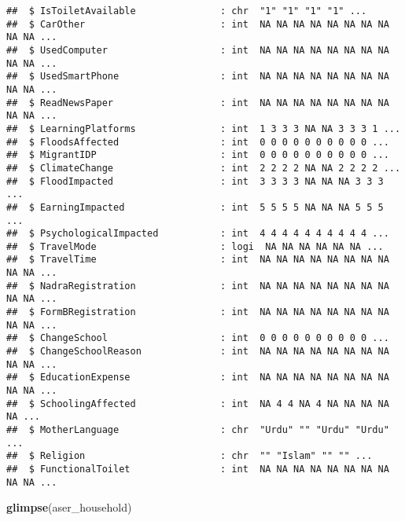 \documentclass[
]{article}
\newenvironment{Shaded}{\begin{snugshade}}{\end{snugshade}}
\newcommand{\FunctionTok}[1]{\textcolor[rgb]{0.13,0.29,0.53}{\textbf{#1}}}
\newcommand{\NormalTok}[1]{#1}
\begin{document}
\begin{verbatim}
##  $ IsToiletAvailable               : chr  "1" "1" "1" "1" ...
##  $ CarOther                        : int  NA NA NA NA NA NA NA NA NA NA ...
##  $ UsedComputer                    : int  NA NA NA NA NA NA NA NA NA NA ...
##  $ UsedSmartPhone                  : int  NA NA NA NA NA NA NA NA NA NA ...
##  $ ReadNewsPaper                   : int  NA NA NA NA NA NA NA NA NA NA ...
##  $ LearningPlatforms               : int  1 3 3 3 NA NA 3 3 3 1 ...
##  $ FloodsAffected                  : int  0 0 0 0 0 0 0 0 0 0 ...
##  $ MigrantIDP                      : int  0 0 0 0 0 0 0 0 0 0 ...
##  $ ClimateChange                   : int  2 2 2 2 NA NA 2 2 2 2 ...
##  $ FloodImpacted                   : int  3 3 3 3 NA NA NA 3 3 3 ...
##  $ EarningImpacted                 : int  5 5 5 5 NA NA NA 5 5 5 ...
##  $ PsychologicalImpacted           : int  4 4 4 4 4 4 4 4 4 4 ...
##  $ TravelMode                      : logi  NA NA NA NA NA NA ...
##  $ TravelTime                      : int  NA NA NA NA NA NA NA NA NA NA ...
##  $ NadraRegistration               : int  NA NA NA NA NA NA NA NA NA NA ...
##  $ FormBRegistration               : int  NA NA NA NA NA NA NA NA NA NA ...
##  $ ChangeSchool                    : int  0 0 0 0 0 0 0 0 0 0 ...
##  $ ChangeSchoolReason              : int  NA NA NA NA NA NA NA NA NA NA ...
##  $ EducationExpense                : int  NA NA NA NA NA NA NA NA NA NA ...
##  $ SchoolingAffected               : int  NA 4 4 NA 4 NA NA NA NA NA ...
##  $ MotherLanguage                  : chr  "Urdu" "" "Urdu" "Urdu" ...
##  $ Religion                        : chr  "" "Islam" "" "" ...
##  $ FunctionalToilet                : int  NA NA NA NA NA NA NA NA NA NA ...
\end{verbatim}

\begin{Shaded}
\begin{Highlighting}[]
\FunctionTok{glimpse}\NormalTok{(aser\_household)}
\end{Highlighting}
\end{Shaded}
\end{document}
